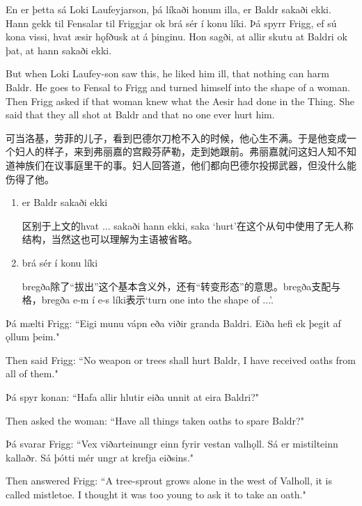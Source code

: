 \begin{paracol}{2}
  En er þetta sá Loki Laufeyjarson, þá líkaði honum illa, er Baldr sakaði ekki. Hann gekk til Fensalar til Friggjar ok brá sér í konu líki. Þá spyrr Frigg, ef sú kona vissi, hvat æsir hǫfðusk at á þinginu. Hon sagði, at allir skutu at Baldri ok þat, at hann sakaði ekki.

  \switchcolumn

  But when Loki Laufey-son saw this, he liked him ill, that nothing can harm Baldr. He goes to Fensal to Frigg and turned himself into the shape of a woman. Then Frigg asked if that woman knew what the Aesir had done in the Thing. She said that they all shot at Baldr and that no one ever hurt him.
\end{paracol}
\begin{translation*}{}
  可当洛基，劳菲的儿子，看到巴德尔刀枪不入的时候，他心生不满。于是他变成一个妇人的样子，来到弗丽嘉的宫殿芬萨勒，走到她跟前。弗丽嘉就问这妇人知不知道神族们在议事庭里干的事。妇人回答道，他们都向巴德尔投掷武器，但没什么能伤得了他。
\end{translation*}
\begin{grammar*}{}
  \begin{enumerate}[leftmargin=*]
    \item er Baldr sakaði ekki

          区别于上文的hvat ... sakaði hann ekki, saka `hurt'在这个从句中使用了无人称结构，当然这也可以理解为主语被省略。

    \item brá sér í konu líki

          bregða除了“拔出”这个基本含义外，还有“转变形态”的意思。bregða支配与格，bregða e-m í e-s líki表示`turn one into the shape of ...'.
  \end{enumerate}
\end{grammar*}
\begin{paracol}{2}
  Þá mælti Frigg: ``Eigi munu vápn eða viðir granda Baldri. Eiða hefi ek þegit af ǫllum þeim."

  \switchcolumn

  Then said Frigg: ``No weapon or trees shall hurt Baldr, I have received oaths from all of them."

  \switchcolumn*

  Þá spyr konan: ``Hafa allir hlutir eiða unnit at eira Baldri?"

  \switchcolumn
  Then asked the woman: ``Have all things taken oaths to spare Baldr?"

  \switchcolumn*
  Þá svarar Frigg: ``Vex viðarteinungr einn fyrir vestan valhǫll. Sá er mistilteinn kallaðr. Sá þótti mér ungr at krefja eiðsins."

  \switchcolumn

  Then answered Frigg: ``A tree-sprout grows alone in the west of Valholl, it is called mistletoe. I thought it was too young to ask it to take an oath."
\end{paracol}
